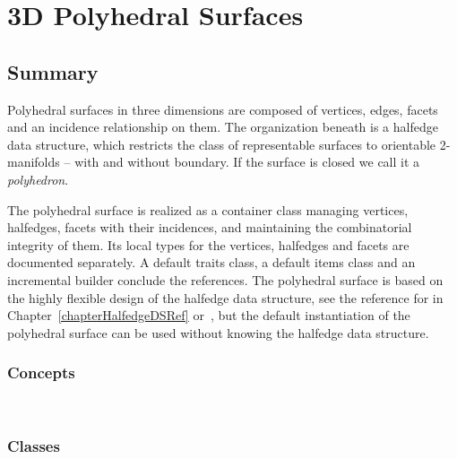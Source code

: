 
\chapter{3D Polyhedral Surfaces}
\label{chapterPolyhedronRef}


\section*{Summary}

Polyhedral surfaces in three dimensions are composed of vertices,
edges, facets and an incidence relationship on them. The organization
beneath is a halfedge data structure, which restricts the class of
representable surfaces to orientable 2-manifolds -- with and without
boundary. If the surface is closed we call it a {\em polyhedron}.

The polyhedral surface is realized as a container class managing
vertices, halfedges, facets with their incidences, and maintaining the
combinatorial integrity of them. Its local types for the vertices,
halfedges and facets are documented separately.  A default traits
class, a default items class and an incremental builder conclude the
references. The polyhedral surface is based on the highly flexible
design of the halfedge data structure, see the reference for
 in Chapter~\ref{chapterHalfedgeDSRef}
or~\cite{k-ugpdd-99}, but the default instantiation of the polyhedral
surface can be used without knowing the halfedge data structure.

\subsection*{Concepts}

\\ 

\subsection*{Classes}

